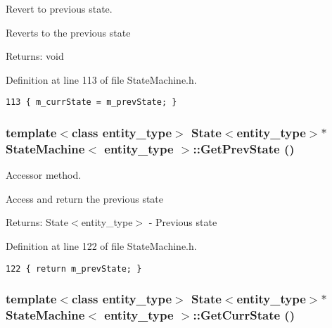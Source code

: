Revert to previous state. 

Reverts to the previous state

\begin{Desc}
\item[Returns:]void \end{Desc}


Definition at line 113 of file StateMachine.h.

\begin{Code}\begin{verbatim}113 { m_currState = m_prevState; }
\end{verbatim}
\end{Code}


\hypertarget{class_state_machine_b319631fb8ea7e6f27f301631b1e1aab}{
\subsubsection[GetPrevState]{\setlength{\rightskip}{0pt plus 5cm}template$<$class entity\_\-type$>$ {\bf State}$<$entity\_\-type$>$$\ast$ {\bf StateMachine}$<$ entity\_\-type $>$::GetPrevState ()}}
\label{class_state_machine_b319631fb8ea7e6f27f301631b1e1aab}


Accessor method. 

Access and return the previous state

\begin{Desc}
\item[Returns:]State$<$entity\_\-type$>$ - Previous state \end{Desc}


Definition at line 122 of file StateMachine.h.

\begin{Code}\begin{verbatim}122 { return m_prevState; }
\end{verbatim}
\end{Code}


\hypertarget{class_state_machine_ac6d93ae87626985bdd2c831c36fd110}{
\subsubsection[GetCurrState]{\setlength{\rightskip}{0pt plus 5cm}template$<$class entity\_\-type$>$ {\bf State}$<$entity\_\-type$>$$\ast$ {\bf StateMachine}$<$ entity\_\-type $>$::GetCurrState ()}}
\label{class_state_machine_ac6d93ae87626985bdd2c831c36fd110}


